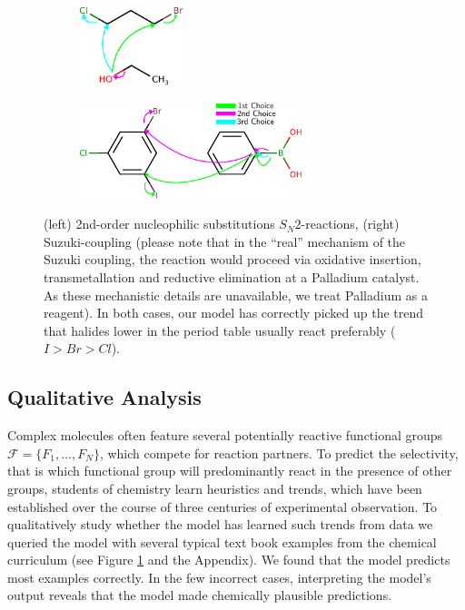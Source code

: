 
\begin{figure}[t]

    \centering
    \begin{subfigure}[b]{0.3\textwidth}
        \centering
        \includegraphics[height=0.9in]{imgs/textbook/reaction3}\\\vspace{0.1in}
    \end{subfigure}%
    \hspace{1cm}
     \begin{subfigure}[b]{0.5\textwidth}
        \centering
        \includegraphics[height=1.1in]{imgs/textbook/reaction7}
    \end{subfigure}
	\caption{(left) 2nd-order nucleophilic substitutions $S_N 2$-reactions, (right) Suzuki-coupling (please note that in the ``real'' mechanism of the Suzuki coupling, the reaction would proceed via oxidative insertion, transmetallation and reductive elimination at a Palladium catalyst. As these mechanistic details are unavailable, we treat Palladium as a reagent). 
    In both cases, our model has correctly picked up the trend that halides lower in the period table usually react preferably ($I>Br>Cl$). }
	\label{fig:qualitative}
\vspace{-0.5em}
\end{figure}



\subsection{Qualitative Analysis}

Complex molecules often feature several potentially reactive functional groups $\mathcal{F}=\{F_1,...,F_N\}$, which compete for reaction partners. 
To predict the selectivity, that is which functional group will predominantly react in the presence of other groups, 
students of chemistry learn heuristics and trends, 
which have been established over the course of three centuries of experimental observation.
To qualitatively study whether the model has learned such trends from data we queried the model with several typical text book examples from the chemical curriculum (see Figure \ref{fig:qualitative} and the Appendix). 
We found that the model predicts most examples correctly. In the few incorrect cases, interpreting the model's output reveals that the model made chemically plausible predictions.

